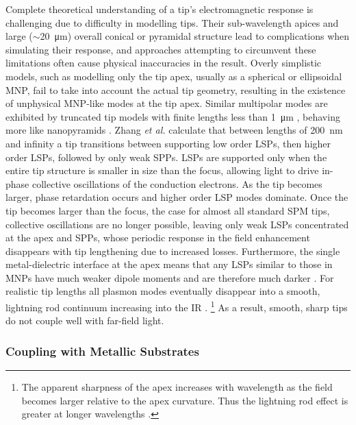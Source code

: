 \documentclass{article}
\begin{document}
Complete theoretical understanding of a tip's electromagnetic response is challenging due to difficulty in modelling tips. Their sub-wavelength apices and large ($\sim$\SI{20}{\micro\metre}) overall conical or pyramidal structure lead to complications when simulating their response, and approaches attempting to circumvent these limitations often cause physical inaccuracies in the result. Overly simplistic models, such as modelling only the tip apex, usually as a spherical or ellipsoidal MNP, fail to take into account the actual tip geometry, resulting in the existence of unphysical MNP-like modes at the tip apex. Similar multipolar modes are exhibited by truncated tip models with finite lengths less than \SI{1}{\micro\metre} \cite{roth2006, goncharenko2006}, behaving more like nanopyramids \cite{schafer2013, cherukulappurath2013}. Zhang \emph{et al.} \cite{zhang2009} calculate that between lengths of \SI{200}{nm} and infinity a tip transitions between supporting low order LSPs, then higher order LSPs, followed by only weak SPPs. LSPs are supported only when the entire tip structure is smaller in size than the focus, allowing light to drive in-phase collective oscillations of the conduction electrons. As the tip becomes larger, phase retardation occurs and higher order LSP modes dominate. Once the tip becomes larger than the focus, the case for almost all standard SPM tips, collective oscillations are no longer possible, leaving only weak LSPs concentrated at the apex and SPPs, whose periodic response in the field enhancement disappears with tip lengthening due to increased losses. Furthermore, the single metal-dielectric interface at the apex means that any LSPs similar to those in MNPs have much weaker dipole moments and are therefore much darker \cite{downes2006}. For realistic tip lengths all plasmon modes eventually disappear into a smooth, lightning rod continuum increasing into the IR \cite{zhang2009}.%
\footnote{The apparent sharpness of the apex increases with wavelength as the field becomes larger relative to the apex curvature. Thus the lightning rod effect is greater at longer wavelengths \cite{zhang2009}.}
As a result, smooth, sharp tips do not couple well with far-field light.

\subsubsection{Coupling with Metallic Substrates}
\end{document}
